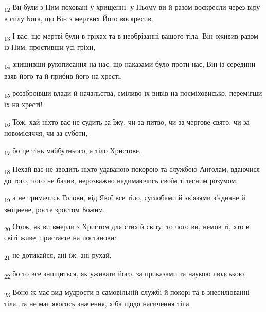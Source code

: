 \begin{tcolorbox}
\textsubscript{12} Ви були з Ним поховані у хрищенні, у Ньому ви й разом воскресли через віру в силу Бога, що Він з мертвих Його воскресив.
\end{tcolorbox}
\begin{tcolorbox}
\textsubscript{13} І вас, що мертві були в гріхах та в необрізанні вашого тіла, Він оживив разом із Ним, простивши усі гріхи,
\end{tcolorbox}
\begin{tcolorbox}
\textsubscript{14} знищивши рукописання на нас, що наказами було проти нас, Він із середини взяв його та й прибив його на хресті,
\end{tcolorbox}
\begin{tcolorbox}
\textsubscript{15} роззброївши влади й начальства, сміливо їх вивів на посміховисько, перемігши їх на хресті!
\end{tcolorbox}
\begin{tcolorbox}
\textsubscript{16} Тож, хай ніхто вас не судить за їжу, чи за питво, чи за чергове свято, чи за новомісяччя, чи за суботи,
\end{tcolorbox}
\begin{tcolorbox}
\textsubscript{17} бо це тінь майбутнього, а тіло Христове.
\end{tcolorbox}
\begin{tcolorbox}
\textsubscript{18} Нехай вас не зводить ніхто удаваною покорою та службою Анголам, вдаючися до того, чого не бачив, нерозважно надимаючись своїм тілесним розумом,
\end{tcolorbox}
\begin{tcolorbox}
\textsubscript{19} а не тримачись Голови, від Якої все тіло, суглобами й зв'язями з'єднане й зміцнене, росте зростом Божим.
\end{tcolorbox}
\begin{tcolorbox}
\textsubscript{20} Отож, як ви вмерли з Христом для стихій світу, то чого ви, немов ті, хто в світі живе, пристаєте на постанови:
\end{tcolorbox}
\begin{tcolorbox}
\textsubscript{21} не дотикайся, ані їж, ані рухай,
\end{tcolorbox}
\begin{tcolorbox}
\textsubscript{22} бо то все знищиться, як уживати його, за приказами та наукою людською.
\end{tcolorbox}
\begin{tcolorbox}
\textsubscript{23} Воно ж має вид мудрости в самовільній службі й покорі та в знесилюванні тіла, та не має якогось значення, хіба щодо насичення тіла.
\end{tcolorbox}
